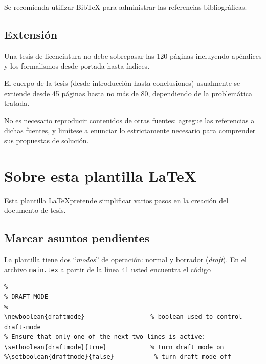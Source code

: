 Se recomienda utilizar BibTeX para administrar las referencias bibliográficas.

\subsection{Extensión}

Una tesis de licenciatura no debe sobrepasar las 120 páginas incluyendo
apéndices y los formalismos desde portada hasta índices.

El cuerpo de la tesis (desde introducción hasta conclusiones) usualmente se
extiende desde 45 páginas hasta no más de 80, dependiendo de la problemática
tratada.

No es necesario reproducir contenidos de otras fuentes: agregue las referencias
a dichas fuentes, y limítese a enunciar lo estrictamente necesario para
comprender sus propuestas de solución.

\section{Sobre esta plantilla \LaTeX}

Esta plantilla \LaTeX pretende simplificar varios pasos en la creación del
documento de tesis.

\subsection{Marcar asuntos pendientes}

La plantilla tiene dos ``\emph{modos}'' de operación: normal y borrador
(\emph{draft}).  En el archivo \texttt{main.tex} a partir de la línea 41 usted
encuentra el código

\begin{verbatim}
%
% DRAFT MODE
%
\newboolean{draftmode}                  % boolean used to control draft-mode
% Ensure that only one of the next two lines is active:
\setboolean{draftmode}{true}            % turn draft mode on
%\setboolean{draftmode}{false}           % turn draft mode off
\end{verbatim}

